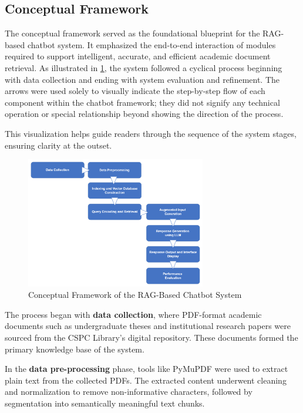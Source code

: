 \begin{refsection}
\section{Conceptual Framework}

The conceptual framework served as the foundational blueprint for the RAG-based chatbot system. It emphasized the end-to-end interaction of modules required to support intelligent, accurate, and efficient academic document retrieval. As illustrated in \ref{fig:conceptual_framework}, the system followed a cyclical process beginning with data collection and ending with system evaluation and refinement.
The arrows were used solely to visually indicate the step-by-step flow of each component within the chatbot framework; they did not signify any technical operation or special relationship beyond showing the direction of the process. 

This visualization helps guide readers through the sequence of the system stages, ensuring clarity at the outset.

\begin{figure}[H]
    \centering
    \includegraphics[width=0.7\textwidth]{figures/framework.png}
    \caption{Conceptual Framework of the RAG-Based Chatbot System}
    \label{fig:conceptual_framework}
\end{figure}

The process began with \textbf{data collection}, where PDF-format academic documents such as undergraduate theses and institutional research papers were sourced from the CSPC Library’s digital repository. These documents formed the primary knowledge base of the system.

In the \textbf{data pre-processing} phase, tools like PyMuPDF were used to extract plain text from the collected PDFs. The extracted content underwent cleaning and normalization to remove non-informative characters, followed by segmentation into semantically meaningful text chunks.


\end{refsection}
